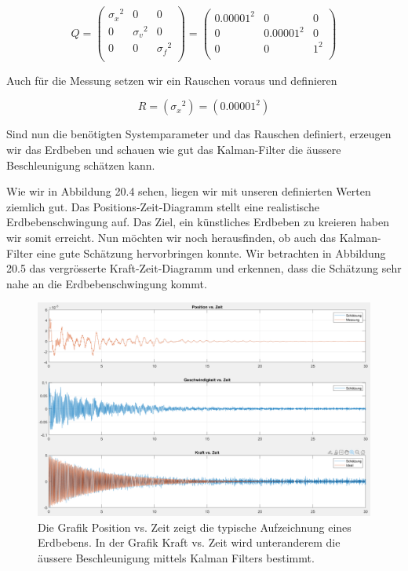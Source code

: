 \begin{equation}
	Q = \left(
	\begin{array}{ccc} 	
		{\sigma_x }^2& 0& 0 \\ 
		0 & {\sigma_v }^2& 0\\ 
		0 & 0& {\sigma_f }^2\\
	\end{array}\right)= \left(
	\begin{array}{ccc} 	
		{0.00001 }^2& 0& 0 \\ 
		0 & {0.00001 }^2& 0\\ 
		0 & 0& {1 }^2\\
	\end{array}\right)
\end{equation} 

Auch für die Messung setzen wir ein Rauschen voraus und definieren

\begin{equation}
R= ({\sigma_x}^2)=
({0.00001}^2)
\end{equation}

Sind nun die benötigten Systemparameter und das Rauschen definiert, erzeugen wir das Erdbeben und schauen wie gut das Kalman-Filter die äussere Beschleunigung schätzen kann.

Wie wir in Abbildung 20.4 sehen, liegen wir mit unseren definierten Werten ziemlich gut.
Das Positions-Zeit-Diagramm stellt eine realistische Erdbebenschwingung auf.
Das Ziel, ein künstliches Erdbeben zu kreieren haben wir somit erreicht.
Nun möchten wir noch herausfinden, ob auch das Kalman-Filter eine gute Schätzung hervorbringen konnte.
Wir betrachten in Abbildung 20.5 das vergrösserte Kraft-Zeit-Diagramm und erkennen, dass die Schätzung sehr nahe an die Erdbebenschwingung kommt.

\begin{figure}
	\begin{center}
		\includegraphics[width=15cm]{papers/erdbeben/Standard_alles.PNG}
		\caption{Die Grafik Position vs. Zeit zeigt die typische Aufzeichnung eines Erdbebens. In der Grafik Kraft vs. Zeit wird unteranderem die äussere Beschleunigung mittels Kalman Filters bestimmt.}
	\end{center}
\end{figure}

